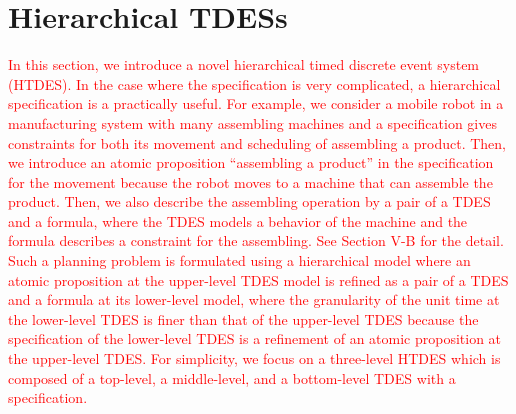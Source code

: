 \documentclass[journal,twoside,web]{IEEEtran}
\newcommand{\red}[1]{\textcolor{red}{#1}}
\begin{document}
\section{Hierarchical TDESs}\label{def:htdes}
%
\red{In this section, we introduce a novel hierarchical timed discrete event system (HTDES). In the case where the specification is very complicated, a hierarchical specification is a practically useful. For example, we consider a mobile robot in a manufacturing system with many assembling machines and a specification gives constraints for both its movement and scheduling of assembling a product. Then, we introduce an atomic proposition ``assembling a product'' in the specification for the movement because the robot moves to a machine that can assemble the product.  Then, we also describe the assembling operation by a pair of a TDES and a formula, where the TDES models a behavior of the machine and the formula describes a constraint for the assembling. See Section V-B for the detail. Such a planning problem is formulated using a hierarchical model where an atomic proposition at the upper-level TDES model is refined as a pair of a TDES and a formula at its lower-level model, where the granularity of the unit time at the lower-level TDES is finer than that of the upper-level TDES because the specification of the lower-level TDES is a refinement of an atomic proposition at the upper-level TDES. For simplicity, we focus on a three-level HTDES which is composed of a top-level, a middle-level, and a bottom-level TDES with a specification. }
%
%
\end{document}
